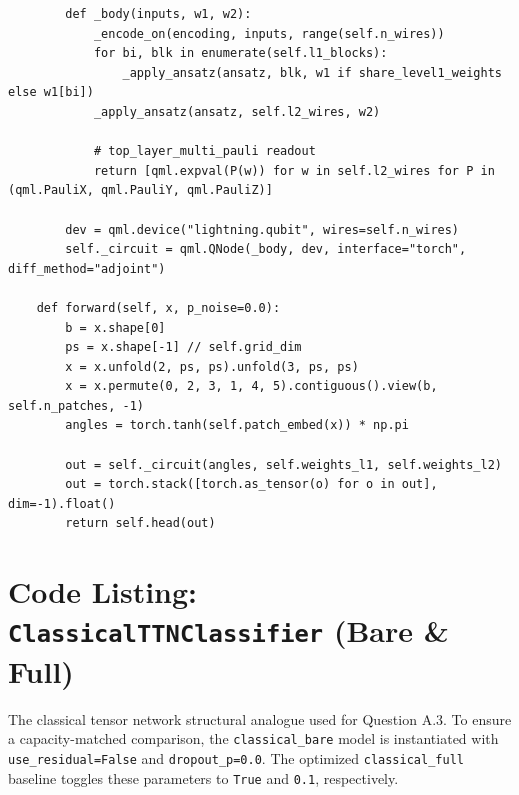 \documentclass[12pt, a4paper, oneside]{report}
\begin{document}
\begin{verbatim}
        def _body(inputs, w1, w2):
            _encode_on(encoding, inputs, range(self.n_wires))
            for bi, blk in enumerate(self.l1_blocks):
                _apply_ansatz(ansatz, blk, w1 if share_level1_weights else w1[bi])
            _apply_ansatz(ansatz, self.l2_wires, w2)
            
            # top_layer_multi_pauli readout
            return [qml.expval(P(w)) for w in self.l2_wires for P in (qml.PauliX, qml.PauliY, qml.PauliZ)]

        dev = qml.device("lightning.qubit", wires=self.n_wires)
        self._circuit = qml.QNode(_body, dev, interface="torch", diff_method="adjoint")

    def forward(self, x, p_noise=0.0):
        b = x.shape[0]
        ps = x.shape[-1] // self.grid_dim
        x = x.unfold(2, ps, ps).unfold(3, ps, ps)
        x = x.permute(0, 2, 3, 1, 4, 5).contiguous().view(b, self.n_patches, -1)
        angles = torch.tanh(self.patch_embed(x)) * np.pi
        
        out = self._circuit(angles, self.weights_l1, self.weights_l2)
        out = torch.stack([torch.as_tensor(o) for o in out], dim=-1).float()
        return self.head(out)
\end{verbatim}

\section*{Code Listing: \texttt{ClassicalTTNClassifier} (Bare \& Full)}
The classical tensor network structural analogue used for Question A.3. To ensure a capacity-matched comparison, the \texttt{classical\_bare} model is instantiated with \texttt{use\_residual=False} and \texttt{dropout\_p=0.0}. The optimized \texttt{classical\_full} baseline toggles these parameters to \texttt{True} and \texttt{0.1}, respectively.
\end{document}
